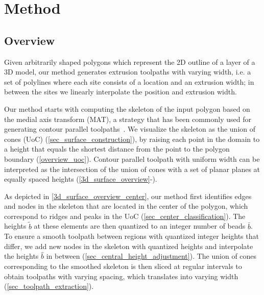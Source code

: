 \section{Method}
\subsection{Overview}

Given arbitrarily shaped polygons which represent the 2D outline of a layer of a 3D model, our method generates extrusion toolpaths with varying width, i.e. a set of polylines where each site consists of a location and an extrusion width;
in between the sites we linearly interpolate the position and extrusion width.

Our method starts with computing the skeleton of the input polygon based on the medial axis transform (MAT), a strategy that has been commonly used for generating contour parallel toolpaths~\cite{eiamsa2003toward}. 
We visualize the skeleton as the union of cones (UoC) (\cref{sec_surface_construction}), by raising each point in the domain to a height that equals the shortest distance from the point to the polygon boundary (\cref{overview_uoc}).
Contour parallel toolpath with uniform width can be interpreted as the intersection of the union of cones with a set of planar planes at equally spaced heights (\cref{3d_surface_overview}-).

As depicted in \cref{3d_surface_overview_center}, our method first identifies edges and nodes in the skeleton that are located in the center of the polygon, which correspond to ridges and peaks in the UoC  (\cref{sec_center_classification}).
The heights $\tilde{b}$ at these elements are then quantized to an integer number of beads $\bar{b}$.
To ensure a smooth toolpath between regions with quantized integer heights that differ, we add new nodes in the skeleton with quantized heights and interpolate the heights $\hat{b}$ in between (\cref{sec_central_height_adjustment}).
The union of cones corresponding to the smoothed skeleton is then sliced at regular intervals to obtain toolpaths with varying spacing, which translates into varying width (\cref{sec_toolpath_extraction}).


